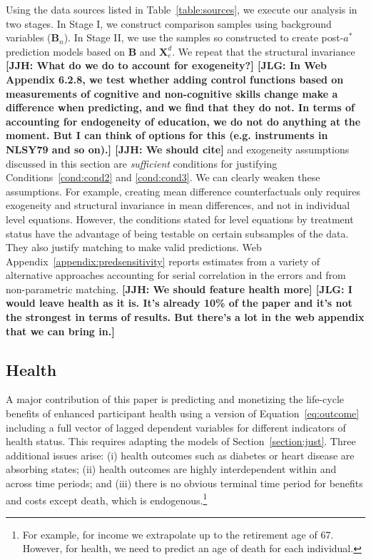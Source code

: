 Using the data sources listed in Table~\ref{table:sources}, we execute our analysis in two stages. In Stage I, we construct comparison samples using background variables ($\bm{B}_n$). In Stage II, we use the samples so constructed to create post-$a^\ast$ prediction models based on $\bm{B}$ and $\bm{X}^d_e$. We repeat that the structural invariance  \textbf{[JJH: What do we do to account for exogeneity?] [JLG: In Web Appendix 6.2.8, we test whether adding control functions based on measurements of cognitive and non-cognitive skills change make a difference when predicting, and we find that they do not. In terms of accounting for endogeneity of education, we do not do anything at the moment. But I can think of options for this (e.g. instruments in NLSY79 and so on).] [JJH: We should cite]} and exogeneity assumptions discussed in this section are \emph{sufficient} conditions for justifying Conditions~\ref{cond:cond2} and \ref{cond:cond3}. We can clearly weaken these assumptions. For example, creating mean difference counterfactuals only requires exogeneity and structural invariance in mean differences, and not in individual level equations. However, the conditions stated for level equations by treatment status have the advantage of being testable on certain subsamples of the data. They also justify matching to make valid predictions. Web Appendix~\ref{appendix:predsensitivity} reports estimates from a variety of alternative approaches accounting for serial correlation in the errors and from non-parametric matching. \textbf{[JJH: We should feature health more] [JLG: I would leave health as it is. It's already 10\% of the paper and it's not the strongest in terms of results. But there's a lot in the web appendix that we can bring in.]}

\subsection{Health} \label{section:health}

A major contribution of this paper is predicting and monetizing the life-cycle benefits of enhanced participant health using a version of Equation~\eqref{eq:outcome} including a full vector of lagged dependent variables for different indicators of health status. This requires adapting the models of Section~\ref{section:just}. Three additional issues arise: (i) health outcomes such as diabetes or heart disease are absorbing states; (ii) health outcomes are highly interdependent within and across time periods; and (iii) there is no obvious terminal time period for benefits and costs except death, which is endogenous.\footnote{For example, for income we extrapolate up to the retirement age of 67. However, for health, we need to predict an age of death for each individual.}

